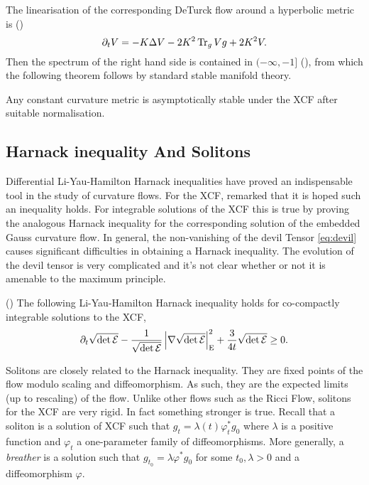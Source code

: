 \documentclass[a4paper,12pt]{amsart}
\begin{document}
The linearisation of the corresponding DeTurck flow around a hyperbolic metric is (\cite[Lemma 2]{MR2448593})
\[
\partial_t V = -K \Delta V -2K^2 \operatorname{Tr}_g V g + 2K^2 V.
\]
Then the spectrum of the right hand side is contained in \((-\infty, -1]\) (\cite[Section 5]{MR2448593}), from which the following theorem follows by standard stable manifold theory.

\begin{thm}[{\cite[Theorem 4]{MR2448593}}]
\label{thm:hyperbolic_stability}

Any constant curvature metric is asymptotically stable under the XCF after suitable normalisation.
\end{thm}

\subsection{Harnack inequality And Solitons}
\label{subsec:xcf_harnack_solitons}

Differential Li-Yau-Hamilton Harnack inequalities have proved an indispensable tool in the study of curvature flows. For the XCF, \cite[p. 9]{MR2055396} remarked that it is hoped such an inequality holds. For integrable solutions of the XCF this is true by proving the analogous Harnack inequality for the corresponding solution of the embedded Gauss curvature flow. In general, the non-vanishing of the devil Tensor \eqref{eq:devil} causes significant difficulties in obtaining a Harnack inequality. The evolution of the devil tensor is very complicated and it's not clear whether or not it is amenable to the  maximum principle.

\begin{thm}(\cite[Section 6]{BIS4})
\label{thm:harnack}
The following Li-Yau-Hamilton Harnack inequality holds for co-compactly integrable solutions to the XCF,
\[
\partial_t \sqrt{\det\operatorname{\mathcal{E}}} - \frac{1}{\sqrt{\det\operatorname{\mathcal{E}}}} \left\lvert{\nabla \sqrt{\det\operatorname{\mathcal{E}}}}\right\rvert_{\operatorname{E}}^2 + \frac{3}{4t}\sqrt{\det\operatorname{\mathcal{E}}} \geq 0.
\]
\end{thm}

Solitons are closely related to the Harnack inequality. They are fixed points of the flow modulo scaling and diffeomorphism. As such, they are the expected limits (up to rescaling) of the flow. Unlike other flows such as the Ricci Flow, solitons for the XCF are very rigid. In fact something stronger is true. Recall that a soliton is a solution of XCF such that \(g_t = \lambda(t) \varphi_t^{\ast} g_0\) where \(\lambda\) is a positive function and \(\varphi_t\) a one-parameter family of diffeomorphisms. More generally, a \emph{breather} is a solution such that \(g_{t_0} = \lambda \varphi^{\ast} g_0\) for some \(t_0 ,\lambda > 0\) and a diffeomorphism \(\varphi\).
\end{document}
